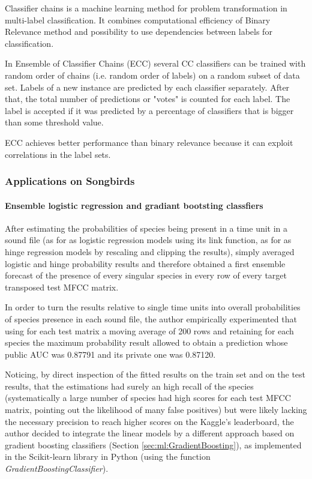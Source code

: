 Classifier chains is a machine learning method for problem transformation in multi-label classification. It combines computational efficiency of Binary Relevance method and possibility to use dependencies between labels for classification.  

\cite{read2011classifier} In Ensemble of Classifier Chains (ECC) several CC classifiers can be trained with random order of chains (i.e. random order of labels) on a random subset of data set. Labels of a new instance are predicted by each classifier separately. After that, the total number of predictions or "votes" is counted for each label. The label is accepted if it was predicted by a percentage of classifiers that is bigger than some threshold value.

ECC achieves better performance than binary relevance because it can exploit correlations in the label sets.\cite{mlsp2}

\subsubsection{Applications on Songbirds}

\paragraph{Ensemble logistic regression and gradiant bootsting classfiers \cite{Massaron13}}

After estimating the probabilities of species being present in a time unit in a
sound file (as for as logistic regression models using its link function, as for as hinge
regression models by rescaling and clipping the results), simply averaged logistic and hinge
probability results and therefore obtained a first ensemble forecast of the presence of every
singular species in every row of every target transposed test MFCC matrix.

In order to turn the results relative to single time units into overall probabilities of species
presence in each sound file, the author empirically experimented that using for each test
matrix a moving average of 200 rows and retaining for each species the maximum
probability result allowed to obtain a prediction whose public AUC was 0.87791 and its
private one was 0.87120.

Noticing, by direct inspection of the fitted results on the train set and on the test results, that
the estimations had surely an high recall of the species (systematically a large number of
species had high scores for each test MFCC matrix, pointing out the likelihood of many false
positives) but were likely lacking the necessary precision to reach higher scores on the
Kaggle’s leaderboard, the author decided to integrate the linear models by a different
approach based on gradient boosting classifiers (Section \ref{sec:ml:GradientBoosting}), as implemented in the Scikit-learn
library in Python \cite{pedregosa2011scikit} (using the function {\em GradientBoostingClassifier}).

